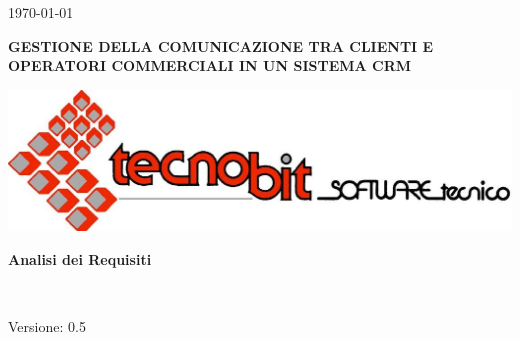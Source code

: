 \usepackage{multirow}


\renewcommand{\insertversion}{0.5} %
\renewcommand{\TITOLODOC}{Analisi dei Requisiti} %

\begin{titlepage}
\begin{center}
	\begin{Large}	\today \end{Large}
\end{center}

\vspace{20pt}

\begin{center}
	\begin{Large}
				\textbf{GESTIONE DELLA COMUNICAZIONE TRA CLIENTI E OPERATORI COMMERCIALI IN UN SISTEMA CRM}
	\end{Large}
\end{center}			

\begin{center}
	\begin{large}
	\end{large}
\end{center}			

\vspace{20pt}

\begin{center}
\includegraphics[scale=0.3]{../tecnobit}
\end{center}

\vspace{140pt}
\begin{center} %
	\begin{Huge}
				\textbf{\TITOLODOC}
	\end{Huge}
			\\
\end{center}
\vspace{140pt}
\begin{center}
Versione: \insertversion
\end{center}
\end{titlepage}

